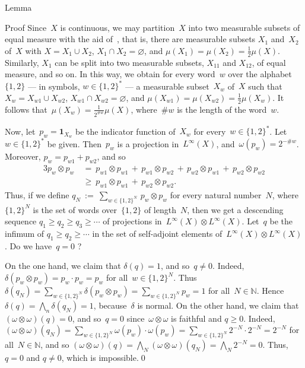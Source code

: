 \documentclass[a]{subfiles}
\begin{document}
\begin{parsec}
\begin{point}{Lemma}
\begin{point}{Proof}
Since~$X$ is continuous,
we may partition~$X$ into two measurable
subsets of equal measure 
with the aid of~,
that is,
there are measurable subsets $X_{1}$ and~$X_{2}$
of~$X$ with $X=X_{1}\cup X_{2}$, $X_{1}\cap X_{2}=\varnothing$,
and
$\mu(X_{1})=\mu(X_{2})=\frac{1}{2}\mu(X)$.
Similarly, $X_{1}$ 
can be split into two measurable subsets, $X_{11}$ and $X_{12}$,
of equal measure, and so on.
In this way,
we obtain for every word~$w$ over the alphabet~$\{1,2\}$
--- in symbols, $w\in \{1,2\}^*$ ---
a measurable subset~$X_w$ of~$X$
such that $X_w = X_{w1}\cup X_{w2}$,
$X_{w1}\cap X_{w2}=\varnothing$,
and $\mu(X_{w1})=\mu(X_{w2})=\frac{1}{2}\mu(X_w)$.
It follows that~$\mu(X_w)=\frac{1}{2^{\#w}}\mu(X)$,
where~$\#w$ is the length of the word~$w$.

Now, let~$p_w = \mathbf{1}_{X_w}$ 
be the indicator function of~$X_w$
for every~$w\in \{1,2\}^*$.
Let~$w\in \{1,2\}^*$ be given.
Then~$p_w$ is a projection in~$L^\infty(X)$,
and~$\omega(p_w)=2^{-\#w}$.
Moreover, $p_w = p_{w1}+p_{w2}$,
and so
\begin{alignat*}{3}
p_w\otimes p_w 
\ &=\  
p_{w1}\otimes p_{w1} \,+\,
p_{w1}\otimes p_{w2} \,+\,
p_{w2}\otimes p_{w1} \,+\,
p_{w2}\otimes p_{w2}\\
\ &\geq\ 
p_{w1}\otimes p_{w1} \,+\,
p_{w2}\otimes p_{w2}.
\end{alignat*}
Thus, if we define 
$q_N\ :=\ \sum_{w\in \{1,2\}^N}\,p_w\otimes p_w$
for every natural number~$N$,
where~$\{1,2\}^N$ is the set of words over~$\{1,2\}$ of length~$N$,
then we get a descending sequence $q_1\geq q_2\geq q_3\geq \dotsb$
of projections in~$L^\infty(X)\otimes L^\infty(X)$.
Let~$q$ be the infimum of $q_1\geq q_2 \geq \dotsb$ 
in the set of self-adjoint elements of~$L^\infty(X)\otimes
L^\infty(X)$.
Do we have~$q=0$ ?

On the one hand,
we claim that $\delta(q)=1$, and so~$q\neq 0$.
Indeed,
$\delta(p_w\otimes p_w)=p_w\cdot p_w = p_w$
for all~$w\in \{1,2\}^N$.
Thus $\delta(q_N) = \sum_{w\in \{1,2\}^N}  \delta(p_w\otimes p_w)
= \sum_{w\in\{1,2\}^N} p_w=1$ for all~$N\in \mathbb{N}$.
Hence $\delta(q)=\bigwedge_n \delta(q_N) = 1$,
because~$\delta$ is normal.
On the other hand,
we claim that $(\omega\otimes \omega)(q)=0$,
and so~$q=0$ since~$\omega\otimes \omega$ is 
faithful and $q\geq 0$.
Indeed,
$(\omega\otimes\omega)(q_N)=
\sum_{w\in\{1,2\}^N} \omega(p_w)\cdot\omega(p_w)
= \sum_{w\in\{1,2\}^N} 2^{-N}\cdot 2^{-N} = 2^{-N}$
for all~$N\in \mathbb{N}$,
	and so $(\omega\otimes\omega)(q)
=\bigwedge_N (\omega\otimes\omega)(q_N) = \bigwedge_N 2^{-N}=0$.
Thus, $q=0$ and $q\neq 0$, which is impossible.\qed
\end{point}
\end{point}
\end{parsec}
\end{document}
